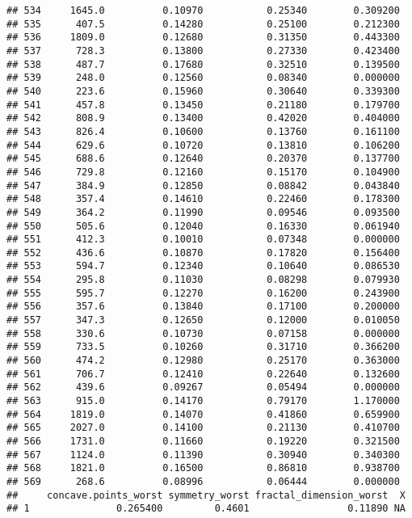 \documentclass[
]{article}
\begin{document}
\begin{verbatim}
## 534     1645.0          0.10970           0.25340        0.309200
## 535      407.5          0.14280           0.25100        0.212300
## 536     1809.0          0.12680           0.31350        0.443300
## 537      728.3          0.13800           0.27330        0.423400
## 538      487.7          0.17680           0.32510        0.139500
## 539      248.0          0.12560           0.08340        0.000000
## 540      223.6          0.15960           0.30640        0.339300
## 541      457.8          0.13450           0.21180        0.179700
## 542      808.9          0.13400           0.42020        0.404000
## 543      826.4          0.10600           0.13760        0.161100
## 544      629.6          0.10720           0.13810        0.106200
## 545      688.6          0.12640           0.20370        0.137700
## 546      729.8          0.12160           0.15170        0.104900
## 547      384.9          0.12850           0.08842        0.043840
## 548      357.4          0.14610           0.22460        0.178300
## 549      364.2          0.11990           0.09546        0.093500
## 550      505.6          0.12040           0.16330        0.061940
## 551      412.3          0.10010           0.07348        0.000000
## 552      436.6          0.10870           0.17820        0.156400
## 553      594.7          0.12340           0.10640        0.086530
## 554      295.8          0.11030           0.08298        0.079930
## 555      595.7          0.12270           0.16200        0.243900
## 556      357.6          0.13840           0.17100        0.200000
## 557      347.3          0.12650           0.12000        0.010050
## 558      330.6          0.10730           0.07158        0.000000
## 559      733.5          0.10260           0.31710        0.366200
## 560      474.2          0.12980           0.25170        0.363000
## 561      706.7          0.12410           0.22640        0.132600
## 562      439.6          0.09267           0.05494        0.000000
## 563      915.0          0.14170           0.79170        1.170000
## 564     1819.0          0.14070           0.41860        0.659900
## 565     2027.0          0.14100           0.21130        0.410700
## 566     1731.0          0.11660           0.19220        0.321500
## 567     1124.0          0.11390           0.30940        0.340300
## 568     1821.0          0.16500           0.86810        0.938700
## 569      268.6          0.08996           0.06444        0.000000
##     concave.points_worst symmetry_worst fractal_dimension_worst  X
## 1               0.265400         0.4601                 0.11890 NA

\end{verbatim}
\end{document}
